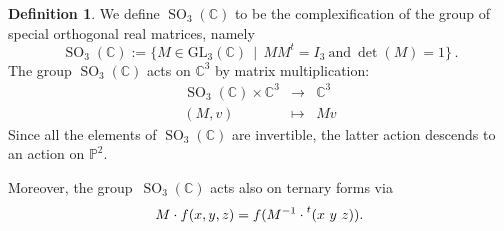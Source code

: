 \documentclass{amsart}
\theoremstyle{plain}
\theoremstyle{definition}
\newtheorem{definition}[lemma]{Definition}
\newcommand{\C}{\mathbb{C}}
\newcommand{\p}{\mathbb{P}}
\newcommand{\SO}{\operatorname{SO}}
\begin{document}
\begin{definition}
We define $\SO_3(\C)$ to be the complexification of the group of special orthogonal real matrices, namely
%
\[
  \SO_3(\C) :=
  \bigl\{
    M \in \mathrm{GL}_3(\C) \, \mid \,
    M M^t = I_3 \ \text{and} \ \det(M) = 1
  \bigr\} \,.
\]
%
The group $\SO_3(\C)$ acts on $\C^3$ by matrix multiplication:
%
\[
  \begin{array}{ccc}
    \SO_3(\C) \times \C^3 & \rightarrow & \C^3 \\
    (M, v) & \mapsto & Mv
  \end{array}
\]
%
Since all the elements of $\SO_3(\C)$ are invertible, the latter action descends to an action on $\p^2$.

Moreover, the group~$\SO_3(\C)$ acts also on ternary forms via
%
\[
  M \cdot f (x,y,z) = f(M^{-1} \cdot \prescript{t} {}( x \ y \ z ) ).
\]
%
\end{definition}
\end{document}
